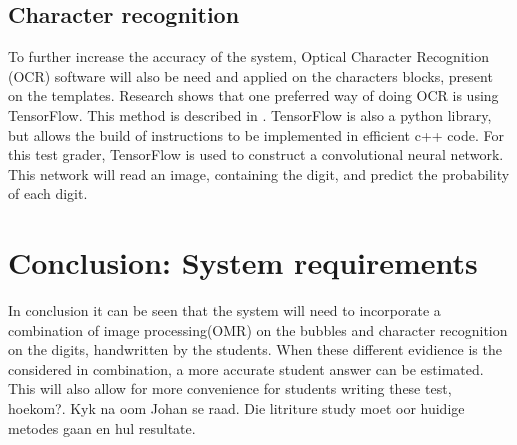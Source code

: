 \subsection{Character recognition}
To further increase the accuracy of the system, Optical Character Recognition (OCR) software will also be need and applied on the characters blocks, present on the templates. Research shows that one preferred way of doing OCR is using TensorFlow. This method is described in \citet{Tensor}. TensorFlow is also a python library, but allows the build of instructions to be implemented in ef{f}icient c++ code. For this test grader, TensorFlow is used to construct a convolutional neural network. This network will read an image, containing the digit, and predict the probability of each digit.

\section{Conclusion: System requirements}

In conclusion it can be seen that the system will need to incorporate a combination of image processing(OMR) on the bubbles and character recognition on the digits, handwritten by the students. When these dif{f}erent evidience is the considered in combination, a more accurate student answer can be estimated. This will also allow for more convenience for students writing these test, hoekom?. Kyk na oom Johan se raad. Die litriture study moet oor huidige metodes gaan en hul resultate.
